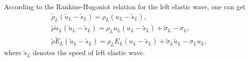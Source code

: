 \documentclass[review]{elsarticle}
\begin{document}
%
 According to the Rankine-Hugoniot relation for the left  elastic wave, one can  get
  \begin{align}
    &\widetilde{\rho}_L(\widetilde{u}_L-\widetilde{s}_L) = \rho_L(u_L-\widetilde{s}_L), \label{eq:RHp1}\\
    &\widetilde{\rho}\widetilde{u}_L(\widetilde{u}_L-\widetilde{s}_L) = \rho_Lu_L(u_L-\widetilde{s}_L)+\widetilde{\sigma}_L-\sigma_L,  \label{eq:RHp2}\\
    &\widetilde{\rho}\widetilde{E}_L(\widetilde{u}_L-\widetilde{s}_L) = \rho_LE_L(u_L-\widetilde{s}_L)+\widetilde{\sigma}_L \widetilde{u}_L-\sigma_Lu_L, \label{eq:RHp3}
\end{align}
where $\widetilde{s}_L$ denotes the speed of left elastic wave.
\end{document}
